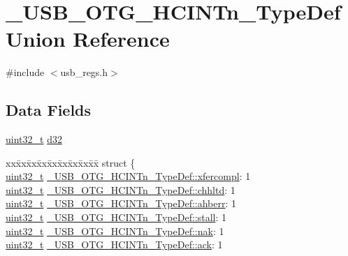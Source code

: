 \hypertarget{union___u_s_b___o_t_g___h_c_i_n_tn___type_def}{\section{\-\_\-\-U\-S\-B\-\_\-\-O\-T\-G\-\_\-\-H\-C\-I\-N\-Tn\-\_\-\-Type\-Def Union Reference}
\label{union___u_s_b___o_t_g___h_c_i_n_tn___type_def}
}


{\ttfamily \#include $<$usb\-\_\-regs.\-h$>$}

\subsection*{Data Fields}
\begin{DoxyCompactItemize}
\item 
\hyperlink{stdint_8h_a435d1572bf3f880d55459d9805097f62}{uint32\-\_\-t} \hyperlink{group___u_s_b___o_t_g___d_r_i_v_e_r_ga285318cfcab218b535f8a7bb06d685d1}{d32}
\item 
\begin{tabbing}
xx\=xx\=xx\=xx\=xx\=xx\=xx\=xx\=xx\=\kill
struct \{\\
\>\hyperlink{stdint_8h_a435d1572bf3f880d55459d9805097f62}{uint32\_t} \hyperlink{group___u_s_b___o_t_g___d_r_i_v_e_r_ga25454c0ff096c325e8a0871e2d2e3f7e}{\_USB\_OTG\_HCINTn\_TypeDef::xfercompl}: 1\\
\>\hyperlink{stdint_8h_a435d1572bf3f880d55459d9805097f62}{uint32\_t} \hyperlink{group___u_s_b___o_t_g___d_r_i_v_e_r_gac58dedceee6dd7ac490b3c43823f1bc9}{\_USB\_OTG\_HCINTn\_TypeDef::chhltd}: 1\\
\>\hyperlink{stdint_8h_a435d1572bf3f880d55459d9805097f62}{uint32\_t} \hyperlink{group___u_s_b___o_t_g___d_r_i_v_e_r_ga05ee851a5de549e1e051f35f3e298971}{\_USB\_OTG\_HCINTn\_TypeDef::ahberr}: 1\\
\>\hyperlink{stdint_8h_a435d1572bf3f880d55459d9805097f62}{uint32\_t} \hyperlink{group___u_s_b___o_t_g___d_r_i_v_e_r_ga5601dd5d1afdbc91a1d023e031f200a6}{\_USB\_OTG\_HCINTn\_TypeDef::stall}: 1\\
\>\hyperlink{stdint_8h_a435d1572bf3f880d55459d9805097f62}{uint32\_t} \hyperlink{group___u_s_b___o_t_g___d_r_i_v_e_r_ga8d865899ab0f1404c53c7ce94dc84aea}{\_USB\_OTG\_HCINTn\_TypeDef::nak}: 1\\
\>\hyperlink{stdint_8h_a435d1572bf3f880d55459d9805097f62}{uint32\_t} \hyperlink{group___u_s_b___o_t_g___d_r_i_v_e_r_ga39f77ce791656afe942d9e317d40b507}{\_USB\_OTG\_HCINTn\_TypeDef::ack}: 1\\

\end{tabbing}
\end{DoxyCompactItemize}
